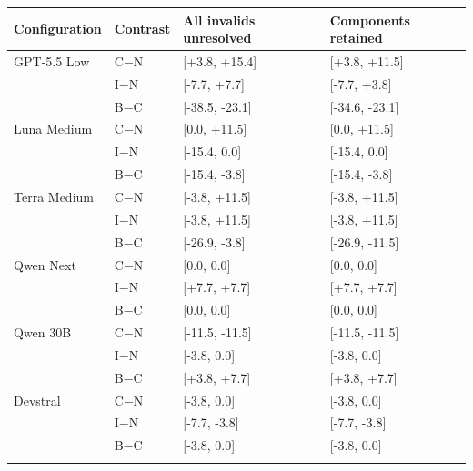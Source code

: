 \begin{tabular}{llll}
\toprule
Configuration & Contrast & All invalids unresolved & Components retained\\
\midrule
GPT-5.5 Low & C$-$N & [+3.8, +15.4] & [+3.8, +11.5]\\
 & I$-$N & [-7.7, +7.7] & [-7.7, +3.8]\\
 & B$-$C & [-38.5, -23.1] & [-34.6, -23.1]\\
\addlinespace
Luna Medium & C$-$N & [0.0, +11.5] & [0.0, +11.5]\\
 & I$-$N & [-15.4, 0.0] & [-15.4, 0.0]\\
 & B$-$C & [-15.4, -3.8] & [-15.4, -3.8]\\
\addlinespace
Terra Medium & C$-$N & [-3.8, +11.5] & [-3.8, +11.5]\\
 & I$-$N & [-3.8, +11.5] & [-3.8, +11.5]\\
 & B$-$C & [-26.9, -3.8] & [-26.9, -11.5]\\
\addlinespace
Qwen Next & C$-$N & [0.0, 0.0] & [0.0, 0.0]\\
 & I$-$N & [+7.7, +7.7] & [+7.7, +7.7]\\
 & B$-$C & [0.0, 0.0] & [0.0, 0.0]\\
\addlinespace
Qwen 30B & C$-$N & [-11.5, -11.5] & [-11.5, -11.5]\\
 & I$-$N & [-3.8, 0.0] & [-3.8, 0.0]\\
 & B$-$C & [+3.8, +7.7] & [+3.8, +7.7]\\
\addlinespace
Devstral & C$-$N & [-3.8, 0.0] & [-3.8, 0.0]\\
 & I$-$N & [-7.7, -3.8] & [-7.7, -3.8]\\
 & B$-$C & [-3.8, 0.0] & [-3.8, 0.0]\\
\addlinespace
\bottomrule
\end{tabular}
